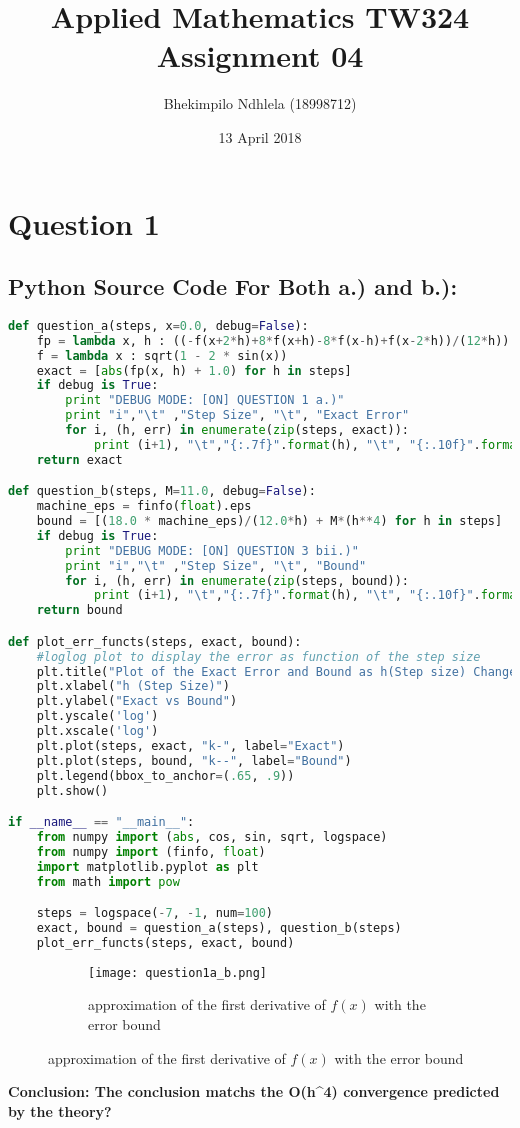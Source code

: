 \documentclass{article}
\title{Applied Mathematics TW324 Assignment 04}
\author{Bhekimpilo Ndhlela (18998712)}
\date{13 April 2018}
\begin{document}
\maketitle
\pagebreak
\section*{Question 1}
\subsection*{Python Source Code For Both a.) and b.): }
\begin{lstlisting}[language=Python]
def question_a(steps, x=0.0, debug=False):
    fp = lambda x, h : ((-f(x+2*h)+8*f(x+h)-8*f(x-h)+f(x-2*h))/(12*h))
    f = lambda x : sqrt(1 - 2 * sin(x))
    exact = [abs(fp(x, h) + 1.0) for h in steps]
    if debug is True:
        print "DEBUG MODE: [ON] QUESTION 1 a.)"
        print "i","\t" ,"Step Size", "\t", "Exact Error"
        for i, (h, err) in enumerate(zip(steps, exact)):
            print (i+1), "\t","{:.7f}".format(h), "\t", "{:.10f}".format(err)
    return exact

def question_b(steps, M=11.0, debug=False):
    machine_eps = finfo(float).eps
    bound = [(18.0 * machine_eps)/(12.0*h) + M*(h**4) for h in steps]
    if debug is True:
        print "DEBUG MODE: [ON] QUESTION 3 bii.)"
        print "i","\t" ,"Step Size", "\t", "Bound"
        for i, (h, err) in enumerate(zip(steps, bound)):
            print (i+1), "\t","{:.7f}".format(h), "\t", "{:.10f}".format(err)
    return bound

def plot_err_functs(steps, exact, bound):
    #loglog plot to display the error as function of the step size
    plt.title("Plot of the Exact Error and Bound as h(Step size) Changes")
    plt.xlabel("h (Step Size)")
    plt.ylabel("Exact vs Bound")
    plt.yscale('log')
    plt.xscale('log')
    plt.plot(steps, exact, "k-", label="Exact")
    plt.plot(steps, bound, "k--", label="Bound")
    plt.legend(bbox_to_anchor=(.65, .9))
    plt.show()

if __name__ == "__main__":
    from numpy import (abs, cos, sin, sqrt, logspace)
    from numpy import (finfo, float)
    import matplotlib.pyplot as plt
    from math import pow

    steps = logspace(-7, -1, num=100)
    exact, bound = question_a(steps), question_b(steps)
    plot_err_functs(steps, exact, bound)
\end{lstlisting}
\pagebreak
\begin{figure}[h!]
  \centering
  \begin{subfigure}{\linewidth}
    \texttt{[image: question1a\_b.png]}
    \caption{approximation of the first derivative of $f(x)$ with the error bound}
  \end{subfigure}
\end{figure}
\textbf{Conclusion: The conclusion matchs the O(h^4) convergence predicted by the theory?}
\pagebreak
\end{document}

